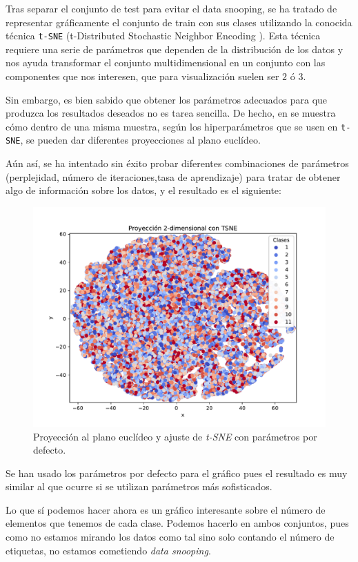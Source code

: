 \documentclass[a4paper, 20pt]{article}
\begin{document}
Tras separar el conjunto de test para evitar el data snooping, se ha tratado de representar gráficamente el conjunto de train con sus clases utilizando la conocida técnica \lstinline{t-SNE} (t-Distributed Stochastic Neighbor Encoding \cite{van_der_maaten_viualizing_2008}). Esta técnica requiere una serie de parámetros que dependen de la distribución de los datos y nos ayuda transformar el conjunto multidimensional en un conjunto con las componentes que nos interesen, que para visualización suelen ser $2$ ó $3$. 


Sin embargo, es bien sabido que obtener los parámetros adecuados para que produzca los resultados deseados no es tarea sencilla. De hecho, en \cite{wattenberg_how_2016} se muestra cómo dentro de una misma muestra, según los hiperparámetros que se usen en \lstinline{t-SNE}, se pueden dar diferentes proyecciones al plano euclídeo. 

Aún así, se ha intentado sin éxito probar diferentes combinaciones de parámetros (perplejidad, número de iteraciones,tasa de aprendizaje) para tratar de obtener algo de información sobre los datos, y el resultado es el siguiente:

\begin{figure}[H]
  \centering
  \includegraphics[width=0.55\linewidth]{media/tsne.pdf}
  \caption{Proyección al plano euclídeo y ajuste de \emph{t-SNE} con parámetros por defecto. }
  \label{fig:tsne}
\end{figure}

Se han usado los parámetros por defecto para el gráfico pues el resultado es muy similar al que ocurre si se utilizan parámetros más sofisticados.

Lo que sí podemos hacer ahora es un gráfico interesante sobre el número de elementos que tenemos de cada clase. Podemos hacerlo en ambos conjuntos, pues como no estamos mirando los datos como tal sino solo contando el número de etiquetas, no estamos cometiendo \emph{data snooping}.
\end{document}
